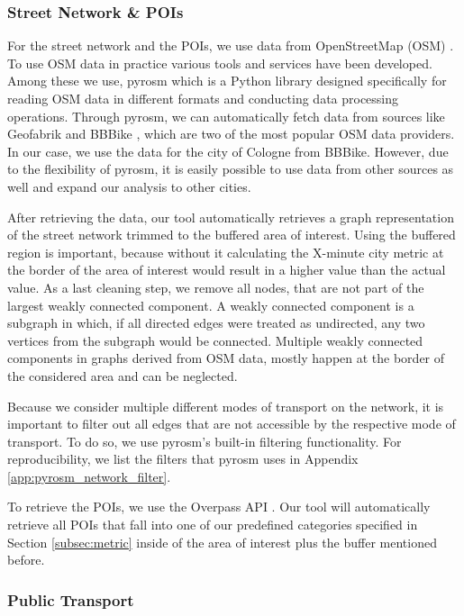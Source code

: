 \subsubsection{Street Network \& POIs}
\label{subs:street_network_pois}

For the street network and the POIs, we use data from OpenStreetMap (OSM) .
To use OSM data in practice various tools and services have been developed.
Among these we use, pyrosm  which is a Python library designed specifically for reading OSM data in different formats and conducting data processing operations.
Through pyrosm, we can automatically fetch data from sources like Geofabrik \cite{GeofabrikDownloadServer} and BBBike \cite{BBBikeExtractsOpenStreetMap}, which are two of the most popular OSM data providers.
In our case, we use the data for the city of Cologne from BBBike.
However, due to the flexibility of pyrosm, it is easily possible to use data from other sources as well and expand our analysis to other cities.

After retrieving the data, our tool automatically retrieves a graph representation of the street network trimmed to the buffered area of interest.
Using the buffered region is important, because without it calculating the X-minute city metric at the border of the area of interest would result in a higher value than the actual value.
As a last cleaning step, we remove all nodes, that are not part of the largest weakly connected component.
A weakly connected component is a subgraph in which, if all directed edges were treated as undirected, any two vertices from the subgraph would be connected.
Multiple weakly connected components in graphs derived from OSM data, mostly happen at the border of the considered area and can be neglected.

Because we consider multiple different modes of transport on the network, it is important to filter out all edges that are not accessible by the respective mode of transport.
To do so, we use pyrosm's built-in filtering functionality.
For reproducibility, we list the filters that pyrosm uses in Appendix \ref{app:pyrosm_network_filter}.

To retrieve the POIs, we use the Overpass API .
Our tool will automatically retrieve all POIs that fall into one of our predefined categories specified in Section \ref{subsec:metric} inside of the area of interest plus the buffer mentioned before.

\subsubsection{Public Transport}
\label{subs:public_transport}

